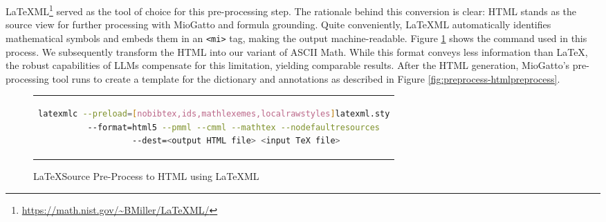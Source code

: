 \LaTeX ML\footnote{\url{https://math.nist.gov/~BMiller/LaTeXML/}} \citep{ginev2011latexml} served as the tool of choice for this pre-processing step. The rationale behind this conversion is clear: HTML stands as the source view for further processing with MioGatto and formula grounding. Quite conveniently, \LaTeX ML automatically identifies mathematical symbols and embeds them in an \lstinline{<mi>} tag, making the output machine-readable. Figure \ref{fig:preprocess-latexml} shows the command used in this process. We subsequently transform the HTML into our variant of ASCII Math. While this format conveys less information than \LaTeX, the robust capabilities of LLMs compensate for this limitation, yielding comparable results. After the HTML generation, MioGatto's pre-processing tool runs to create a template for the dictionary and annotations as described in Figure \ref{fig:preprocess-htmlpreprocess}.


\begin{table}[htpb]
  \centering
  \quad 
  \caption[Token Usages]{Token usages of different types of encoding}
  \label{fig:ascii-math}
\end{table}

\begin{figure}[htpb]
  \centering
  \begin{tabular}{c}
  \begin{lstlisting}[language=bash]
latexmlc --preload=[nobibtex,ids,mathlexemes,localrawstyles]latexml.sty
         --format=html5 --pmml --cmml --mathtex --nodefaultresources 
         --dest=<output HTML file> <input TeX file>
  \end{lstlisting}
  \end{tabular}
  \caption[latexml pre-processing]{\LaTeX \space Source Pre-Process to HTML using \LaTeX ML \footnotemark[2]}\label{fig:preprocess-latexml}
\end{figure}


